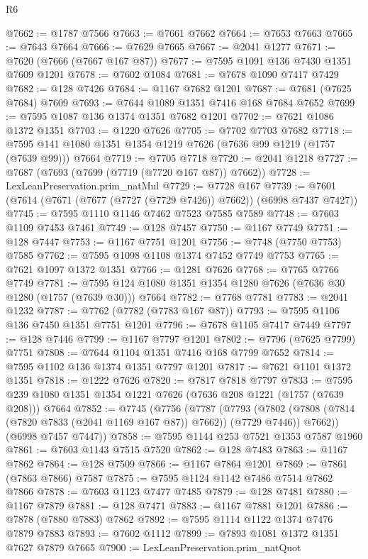 \begin{lexlean}{R6}
\begin{coremodule}
@7662 := @1787 @7566
@7663 := @7661 @7662
@7664 := @7653 @7663
@7665 := @7643 @7664
@7666 := @7629 @7665
@7667 := @2041 @1277
@7671 := @7620 (@7666 (@7667 @167 @87))
@7677 := @7595 @1091 @136 @7430 @1351 @7609 @1201
@7678 := @7602 @1084
@7681 := @7678 @1090 @7417 @7429
@7682 := @128 @7426
@7684 := @1167 @7682 @1201
@7687 := @7681 (@7625 @7684) @7609
@7693 := @7644 @1089 @1351 @7416 @168 @7684 @7652
@7699 := @7595 @1087 @136 @1374 @1351 @7682 @1201
@7702 := @7621 @1086 @1372 @1351
@7703 := @1220 @7626
@7705 := @7702 @7703 @7682
@7718 := @7595 @141 @1080 @1351 @1354 @1219 @7626 (@7636 @99 @1219 (@1757 (@7639 @99))) @7664
@7719 := @7705 @7718
@7720 := @2041 @1218
@7727 := @7687 (@7693 (@7699 (@7719 (@7720 @167 @87)) @7662))
@7728 := LexLeanPreservation.prim_natMul
@7729 := @7728 @167
@7739 := @7601 (@7614 (@7671 (@7677 (@7727 (@7729 @7426)) @7662)) (@6998 @7437 @7427))
@7745 := @7595 @1110 @1146 @7462 @7523 @7585 @7589
@7748 := @7603 @1109 @7453 @7461
@7749 := @128 @7457
@7750 := @1167 @7749
@7751 := @128 @7447
@7753 := @1167 @7751 @1201
@7756 := @7748 (@7750 @7753) @7585
@7762 := @7595 @1098 @1108 @1374 @7452 @7749 @7753
@7765 := @7621 @1097 @1372 @1351
@7766 := @1281 @7626
@7768 := @7765 @7766 @7749
@7781 := @7595 @124 @1080 @1351 @1354 @1280 @7626 (@7636 @30 @1280 (@1757 (@7639 @30))) @7664
@7782 := @7768 @7781
@7783 := @2041 @1232
@7787 := @7762 (@7782 (@7783 @167 @87))
@7793 := @7595 @1106 @136 @7450 @1351 @7751 @1201
@7796 := @7678 @1105 @7417 @7449
@7797 := @128 @7446
@7799 := @1167 @7797 @1201
@7802 := @7796 (@7625 @7799) @7751
@7808 := @7644 @1104 @1351 @7416 @168 @7799 @7652
@7814 := @7595 @1102 @136 @1374 @1351 @7797 @1201
@7817 := @7621 @1101 @1372 @1351
@7818 := @1222 @7626
@7820 := @7817 @7818 @7797
@7833 := @7595 @239 @1080 @1351 @1354 @1221 @7626 (@7636 @208 @1221 (@1757 (@7639 @208))) @7664
@7852 := @7745
    (@7756
      (@7787
        (@7793
          (@7802 (@7808 (@7814 (@7820 @7833 (@2041 @1169 @167 @87)) @7662)) (@7729 @7446))
          @7662))
      (@6998 @7457 @7447))
@7858 := @7595 @1144 @253 @7521 @1353 @7587 @1960
@7861 := @7603 @1143 @7515 @7520
@7862 := @128 @7483
@7863 := @1167 @7862
@7864 := @128 @7509
@7866 := @1167 @7864 @1201
@7869 := @7861 (@7863 @7866) @7587
@7875 := @7595 @1124 @1142 @7486 @7514 @7862 @7866
@7878 := @7603 @1123 @7477 @7485
@7879 := @128 @7481
@7880 := @1167 @7879
@7881 := @128 @7471
@7883 := @1167 @7881 @1201
@7886 := @7878 (@7880 @7883) @7862
@7892 := @7595 @1114 @1122 @1374 @7476 @7879 @7883
@7893 := @7602 @1112
@7899 := @7893 @1081 @1372 @1351 @7627 @7879 @7665
@7900 := LexLeanPreservation.prim_natQuot

\end{coremodule}
\end{lexlean}
